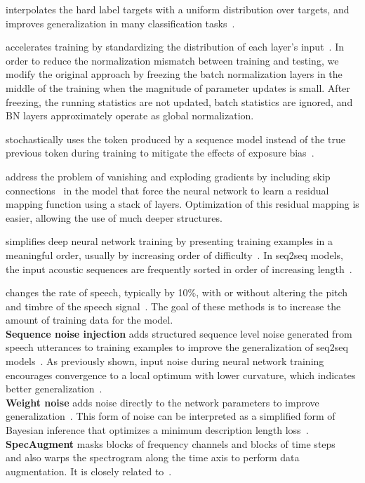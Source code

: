 \documentclass[a4paper]{article}
\begin{document}
 interpolates the hard label targets with a uniform distribution over targets, and improves generalization in many classification tasks~\cite{Szegedy2016}.

 accelerates training by standardizing the distribution of each layer's input~\cite{Ioffe2015}.
In order to reduce the normalization mismatch between training and testing, we modify the original approach by freezing the batch normalization layers in the middle of the training when the magnitude of parameter updates is small.
After freezing, the running statistics are not updated, batch statistics are ignored, and BN layers approximately operate as global normalization.

 stochastically uses the token produced by a sequence model instead of the true previous token during training to mitigate the effects of exposure bias~\cite{Bengio2015}.

 address the problem of vanishing and exploding gradients by including skip connections~\cite{He2016} in the model that force the neural network to learn a residual mapping function using a stack of layers.
Optimization of this residual mapping is easier, allowing the use of much deeper structures.

 simplifies deep neural network training by presenting training examples in a meaningful order, usually by increasing order of difficulty~\cite{Bengio2009}.
In seq2seq models, the input acoustic sequences are frequently sorted in order of increasing length~\cite{Amodei2016}.

 changes the rate of speech, typically by 10\%, with or without altering the pitch and timbre of the speech signal~\cite{Kanda2013,Ko15}.
The goal of these methods is to increase the amount of training data for the model.
\\{\bf Sequence noise injection} adds structured sequence level noise generated from speech utterances to training examples to improve the generalization of seq2seq models~\cite{Saon2019}.
As previously shown, input noise during neural network training encourages convergence to a local optimum with lower curvature, which indicates better generalization~\cite{bishop95}.
\\{\bf Weight noise} adds noise directly to the network parameters to improve generalization~\cite{Murray1994}.
This form of noise can be interpreted as a simplified form of Bayesian inference that optimizes a minimum description length loss~\cite{Graves2011}.
\\{\bf SpecAugment} masks blocks of frequency channels and blocks of time steps~\cite{Park2019} and also warps the spectrogram along the time axis to perform data augmentation.
 It is closely related to~\cite{Zhong2017}.
\end{document}
